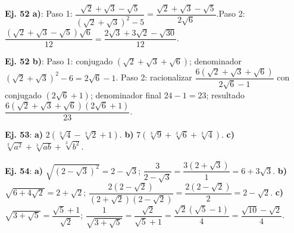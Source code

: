 \documentclass[11pt, letterpaper]{article}
\begin{document}
\medskip

\begin{tcolorbox}[answerbox, title={Bloque N — Racionalización avanzada}]

\noindent\textbf{Ej. 52 a)}: Paso 1: $\dfrac{\sqrt{2}+\sqrt{3}-\sqrt{5}}{(\sqrt{2}+\sqrt{3})^2-5}=\dfrac{\sqrt{2}+\sqrt{3}-\sqrt{5}}{2\sqrt{6}}$.\quad Paso 2: $\dfrac{(\sqrt{2}+\sqrt{3}-\sqrt{5})\sqrt{6}}{12}=\dfrac{2\sqrt{3}+3\sqrt{2}-\sqrt{30}}{12}$.

\medskip

\noindent\textbf{Ej. 52 b)}: Paso 1: conjugado $(\sqrt{2}+\sqrt{3}+\sqrt{6})$; denominador $(\sqrt{2}+\sqrt{3})^2-6=2\sqrt{6}-1$. Paso 2: racionalizar $\dfrac{6(\sqrt{2}+\sqrt{3}+\sqrt{6})}{2\sqrt{6}-1}$ con conjugado $(2\sqrt{6}+1)$; denominador final $24-1=23$; resultado $\dfrac{6(\sqrt{2}+\sqrt{3}+\sqrt{6})(2\sqrt{6}+1)}{23}$.

\medskip

\noindent\textbf{Ej. 53}: \textbf{a)} $2(\sqrt[3]{4}-\sqrt[3]{2}+1)$. \textbf{b)} $7(\sqrt[3]{9}+\sqrt[3]{6}+\sqrt[3]{4})$. \textbf{c)} $\sqrt[3]{a^2}+\sqrt[3]{ab}+\sqrt[3]{b^2}$.

\medskip

\noindent\textbf{Ej. 54}: \textbf{a)} $\sqrt{(2-\sqrt{3})^2}=2-\sqrt{3}$;\; $\dfrac{3}{2-\sqrt{3}}=\dfrac{3(2+\sqrt{3})}{1}=6+3\sqrt{3}$. \textbf{b)} $\sqrt{6+4\sqrt{2}}=2+\sqrt{2}$;\; $\dfrac{2(2-\sqrt{2})}{(2+\sqrt{2})(2-\sqrt{2})}=\dfrac{2(2-\sqrt{2})}{2}=2-\sqrt{2}$. \textbf{c)} $\sqrt{3+\sqrt{5}}=\dfrac{\sqrt{5}+1}{\sqrt{2}}$;\; $\dfrac{1}{\sqrt{3+\sqrt{5}}}=\dfrac{\sqrt{2}}{\sqrt{5}+1}=\dfrac{\sqrt{2}(\sqrt{5}-1)}{4}=\dfrac{\sqrt{10}-\sqrt{2}}{4}$.
\end{tcolorbox}

\medskip
\end{document}
